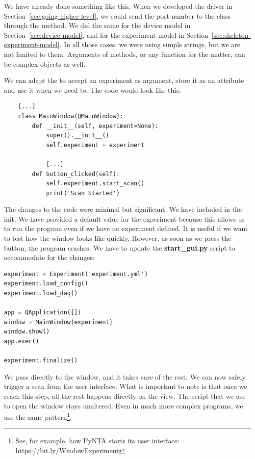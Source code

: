 We have already done something like this. When we developed the driver in Section~\ref{sec:going-higher-level}, we could send the port number to the class through the  method. We did the same for the device model in Section~\ref{sec:device-model}, and for the experiment model in Section~\ref{sec:skeleton-experiment-model}. In all those cases, we were using simple strings, but we are not limited to them. Arguments of methods, or any function for the matter, can be complex objects as well.

We can adapt the  to accept an experiment as argument, store it as an attribute and use it when we need to. The code would look like this:

\begin{verbatim}
    [...]
    class MainWindow(QMainWindow):
        def __init__(self, experiment=None):
            super().__init__()
            self.experiment = experiment

            [...]
        def button_clicked(self):
            self.experiment.start_scan()
            print('Scan Started')
\end{verbatim}

The changes to the code were minimal but significant. We have included  in the init. We have provided a default value for the experiment because this allows us to run the program even if we have no experiment defined. It is useful if we want to test how the window looks like quickly. However, as soon as we press the button, the program crashes. We have to update the \textbf{start\_gui.py} script to accommodate for the changes:

\begin{verbatim}
experiment = Experiment('experiment.yml')
experiment.load_config()
experiment.load_daq()

app = QApplication([])
window = MainWindow(experiment)
window.show()
app.exec()

experiment.finalize()
\end{verbatim}

We pass  directly to the window, and it takes care of the rest. We can now safely trigger a scan from the user interface. What is important to note is that once we reach this step, all the rest happens directly on the view. The script that we use to open the window stays unaltered. Even in much more complex programs, we use the same pattern\footnote{See, for example, how PyNTA starts its user interface: https://bit.ly/WindowExperiment}.

